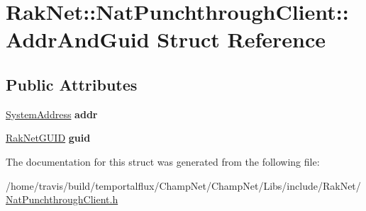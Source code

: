 \hypertarget{struct_rak_net_1_1_nat_punchthrough_client_1_1_addr_and_guid}{\section{Rak\-Net\-:\-:Nat\-Punchthrough\-Client\-:\-:Addr\-And\-Guid Struct Reference}
\label{struct_rak_net_1_1_nat_punchthrough_client_1_1_addr_and_guid}
}
\subsection*{Public Attributes}
\begin{DoxyCompactItemize}
\item 
\hypertarget{struct_rak_net_1_1_nat_punchthrough_client_1_1_addr_and_guid_ac4ca2dae3906c7d484f525dc6a384fe3}{\hyperlink{struct_rak_net_1_1_system_address}{System\-Address} {\bfseries addr}}\label{struct_rak_net_1_1_nat_punchthrough_client_1_1_addr_and_guid_ac4ca2dae3906c7d484f525dc6a384fe3}

\item 
\hypertarget{struct_rak_net_1_1_nat_punchthrough_client_1_1_addr_and_guid_ab326da0ad4ee7cb790759334b2f91b13}{\hyperlink{struct_rak_net_1_1_rak_net_g_u_i_d}{Rak\-Net\-G\-U\-I\-D} {\bfseries guid}}\label{struct_rak_net_1_1_nat_punchthrough_client_1_1_addr_and_guid_ab326da0ad4ee7cb790759334b2f91b13}

\end{DoxyCompactItemize}


The documentation for this struct was generated from the following file\-:\begin{DoxyCompactItemize}
\item 
/home/travis/build/temportalflux/\-Champ\-Net/\-Champ\-Net/\-Libs/include/\-Rak\-Net/\hyperlink{_nat_punchthrough_client_8h}{Nat\-Punchthrough\-Client.\-h}\end{DoxyCompactItemize}
